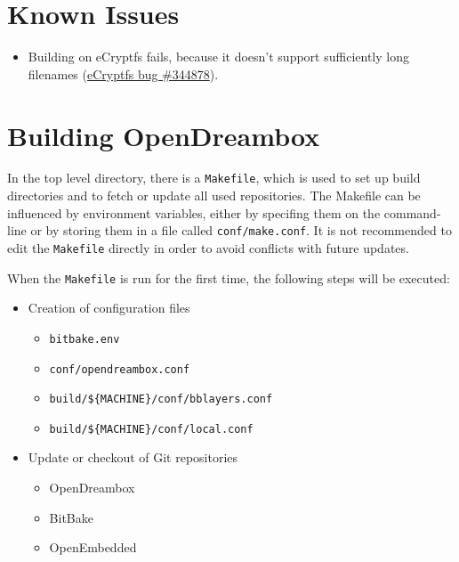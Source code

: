 \documentclass[a4paper]{article}
\newcommand{\shell}[1]{\texttt{\small #1}}
\begin{document}
\section{Known Issues}

  \begin{itemize}
    \item Building on eCryptfs fails, because it doesn't support sufficiently long filenames (\href{https://bugs.launchpad.net/ecryptfs/+bug/344878}{eCryptfs bug \#344878}).
  \end{itemize}

\pagebreak

\section{Building OpenDreambox}

  In the top level directory, there is a \shell{Makefile}, which is used to
  set up build directories and to fetch or update all used repositories.
  The Makefile can be influenced by environment variables, either
  by specifing them on the command-line or by storing them in a file called
  \shell{conf/make.conf}. It is not recommended to edit the \shell{Makefile} directly
  in order to avoid conflicts with future updates.

  When the \shell{Makefile} is run for the first time, the following steps will
  be executed:

  \begin{itemize}
    \item Creation of configuration files
      \begin{itemize}
        \item \shell{bitbake.env}
        \item \shell{conf/opendreambox.conf}
        \item \shell{build/\$\{MACHINE\}/conf/bblayers.conf}
        \item \shell{build/\$\{MACHINE\}/conf/local.conf}
      \end{itemize}
    \item Update or checkout of Git repositories
      \begin{itemize}
        \item OpenDreambox
        \item BitBake
        \item OpenEmbedded
      \end{itemize}
  \end{itemize}
\end{document}
